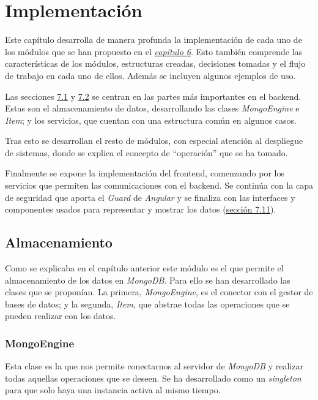 \chapter{Implementación}

Este capítulo desarrolla de manera profunda la implementación de cada uno de los módulos que se han propuesto en el \hyperref[cap6]{\textit{capítulo 6}}. Esto también comprende las características de los módulos, estructuras creadas, decisiones tomadas y el flujo de trabajo en cada uno de ellos. Además se incluyen algunos ejemplos de uso.

Las secciones \hyperref[71]{7.1} y \hyperref[72]{7.2} se centran en las partes más importantes en el backend. Estas son el almacenamiento de datos, desarrollando las clases \textit{MongoEngine} e \textit{Item}; y los servicios, que cuentan con una estructura común en algunos casos.

Tras esto se desarrollan el resto de módulos, con especial atención al despliegue de sistemas, donde se explica el concepto de ``operación'' que se ha tomado.

Finalmente se expone la implementación del frontend, comenzando por los servicios que permiten las comunicaciones con el backend. Se continúa con la capa de seguridad que aporta el \textit{Guard} de \textit{Angular} y se finaliza con las interfaces y componentes usados para representar y mostrar los datos (\hyperref[711]{sección 7.11}).

\section{Almacenamiento}
\label{71}

Como se explicaba en el capítulo anterior este módulo es el que permite el almacenamiento de los datos en \textit{MongoDB}. Para ello se han desarrollado las clases que se proponían. La primera, \textit{MongoEngine}, es el conector con el gestor de bases de datos; y la segunda, \textit{Item}, que abstrae todas las operaciones que se pueden realizar con los datos.

\subsection{MongoEngine}
\label{sec:mongoengine}

Esta clase es la que nos permite conectarnos al servidor de \textit{MongoDB} y realizar todas aquellas operaciones que se deseen. Se ha desarrollado como un \textit{singleton} para que solo haya una instancia activa al mismo tiempo.

